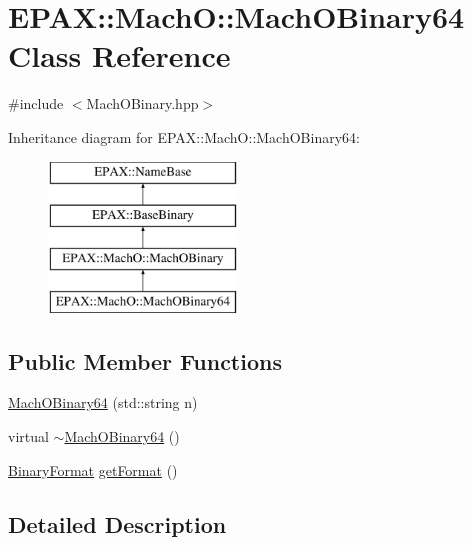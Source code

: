 \hypertarget{class_e_p_a_x_1_1_mach_o_1_1_mach_o_binary64}{\section{\-E\-P\-A\-X\-:\-:\-Mach\-O\-:\-:\-Mach\-O\-Binary64 \-Class \-Reference}
\label{class_e_p_a_x_1_1_mach_o_1_1_mach_o_binary64}
}


{\ttfamily \#include $<$\-Mach\-O\-Binary.\-hpp$>$}

\-Inheritance diagram for \-E\-P\-A\-X\-:\-:\-Mach\-O\-:\-:\-Mach\-O\-Binary64\-:\begin{figure}[H]
\begin{center}
\leavevmode
\includegraphics[height=4.000000cm]{class_e_p_a_x_1_1_mach_o_1_1_mach_o_binary64}
\end{center}
\end{figure}
\subsection*{\-Public \-Member \-Functions}
\begin{DoxyCompactItemize}
\item 
\hyperlink{class_e_p_a_x_1_1_mach_o_1_1_mach_o_binary64_a53cd5a142c8aad603e2dec433a22d55d}{\-Mach\-O\-Binary64} (std\-::string n)
\item 
virtual \hyperlink{class_e_p_a_x_1_1_mach_o_1_1_mach_o_binary64_a306f38371fc7cbaffad6a5e8768cfc3b}{$\sim$\-Mach\-O\-Binary64} ()
\item 
\hyperlink{namespace_e_p_a_x_a4be639c006ef14def4708b37ee6dd67d}{\-Binary\-Format} \hyperlink{class_e_p_a_x_1_1_mach_o_1_1_mach_o_binary64_ab2aa03d22ba0339c415a9dc9e6a0912b}{get\-Format} ()
\end{DoxyCompactItemize}


\subsection{\-Detailed \-Description}


